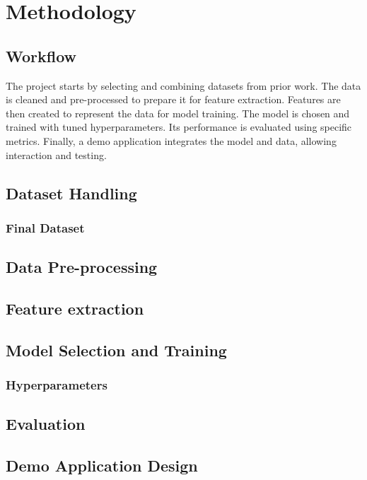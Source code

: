 \chapter{Methodology}

\section{Workflow}
The project starts by selecting and combining datasets from prior work. The data is cleaned and pre-processed to prepare it for feature extraction. Features are then created to represent the data for model training. The model is chosen and trained with tuned hyperparameters. Its performance is evaluated using specific metrics. Finally, a demo application integrates the model and data, allowing interaction and testing.

\section{Dataset Handling}
\subsection{Final Dataset}

\section{Data Pre-processing}

\section{Feature extraction}

\section{Model Selection and Training}
\subsection{Hyperparameters}

\section{Evaluation}

\section{Demo Application Design}
